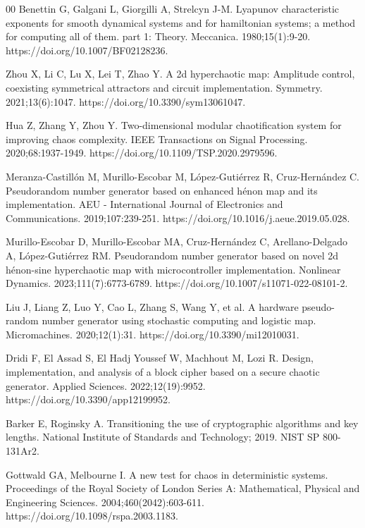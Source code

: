 \documentclass[preprint,12pt]{elsarticle}
\begin{document}
\begin{thebibliography}{00}
Benettin G, Galgani L, Giorgilli A, Strelcyn J-M. Lyapunov characteristic exponents for smooth dynamical systems and for hamiltonian systems; a method for computing all of them. part 1: Theory. Meccanica. 1980;15(1):9-20. https://doi.org/10.1007/BF02128236.

Zhou X, Li C, Lu X, Lei T, Zhao Y. A 2d hyperchaotic map: Amplitude control, coexisting symmetrical attractors and circuit implementation. Symmetry. 2021;13(6):1047. https://doi.org/10.3390/sym13061047.

Hua Z, Zhang Y, Zhou Y. Two-dimensional modular chaotification system for improving chaos complexity. IEEE Transactions on Signal Processing. 2020;68:1937-1949. https://doi.org/10.1109/TSP.2020.2979596.

Meranza-Castillón M, Murillo-Escobar M, López-Gutiérrez R, Cruz-Hernández C. Pseudorandom number generator based on enhanced hénon map and its implementation. AEU - International Journal of Electronics and Communications. 2019;107:239-251. https://doi.org/10.1016/j.aeue.2019.05.028.

Murillo-Escobar D, Murillo-Escobar MA, Cruz-Hernández C, Arellano-Delgado A, López-Gutiérrez RM. Pseudorandom number generator based on novel 2d hénon-sine hyperchaotic map with microcontroller implementation. Nonlinear Dynamics. 2023;111(7):6773-6789. https://doi.org/10.1007/s11071-022-08101-2.

Liu J, Liang Z, Luo Y, Cao L, Zhang S, Wang Y, et al. A hardware pseudo-random number generator using stochastic computing and logistic map. Micromachines. 2020;12(1):31. https://doi.org/10.3390/mi12010031.

Dridi F, El Assad S, El Hadj Youssef W, Machhout M, Lozi R. Design, implementation, and analysis of a block cipher based on a secure chaotic generator. Applied Sciences. 2022;12(19):9952. https://doi.org/10.3390/app12199952.

Barker E, Roginsky A. Transitioning the use of cryptographic algorithms and key lengths. National Institute of Standards and Technology; 2019. NIST SP 800-131Ar2.

Gottwald GA, Melbourne I. A new test for chaos in deterministic systems. Proceedings of the Royal Society of London Series A: Mathematical, Physical and Engineering Sciences. 2004;460(2042):603-611. https://doi.org/10.1098/rspa.2003.1183.


\end{thebibliography}
\end{document}
